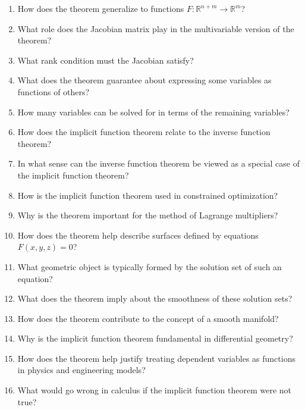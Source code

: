 \begin{enumerate}
  \item How does the theorem generalize to functions \(F:\mathbb{R}^{n+m} \to \mathbb{R}^m\)?
  \item What role does the Jacobian matrix play in the multivariable version of the theorem?
  \item What rank condition must the Jacobian satisfy?
  \item What does the theorem guarantee about expressing some variables as functions of others?
  \item How many variables can be solved for in terms of the remaining variables?
  \item How does the implicit function theorem relate to the inverse function theorem?
  \item In what sense can the inverse function theorem be viewed as a special case of the implicit function theorem?
  \item How is the implicit function theorem used in constrained optimization?
  \item Why is the theorem important for the method of Lagrange multipliers?
  \item How does the theorem help describe surfaces defined by equations \(F(x,y,z)=0\)?
  \item What geometric object is typically formed by the solution set of such an equation?
  \item What does the theorem imply about the smoothness of these solution sets?
  \item How does the theorem contribute to the concept of a smooth manifold?
  \item Why is the implicit function theorem fundamental in differential geometry?
  \item How does the theorem help justify treating dependent variables as functions in physics and engineering models?
  \item What would go wrong in calculus if the implicit function theorem were not true?
\end{enumerate}
